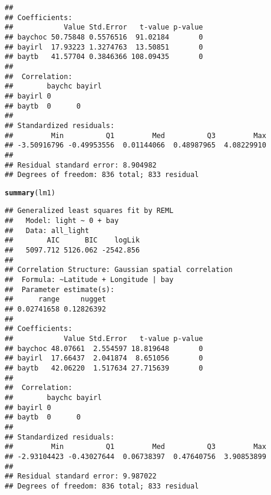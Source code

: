 \documentclass{article}\usepackage[]{graphicx}\usepackage[]{color}
\makeatletter
\newcommand{\hlstd}[1]{\textcolor[rgb]{0.345,0.345,0.345}{#1}}%
\newcommand{\hlkwd}[1]{\textcolor[rgb]{0.737,0.353,0.396}{\textbf{#1}}}%
\newenvironment{kframe}{%
 \def\at@end@of@kframe{}%
 \ifinner\ifhmode%
  \def\at@end@of@kframe{\end{minipage}}%
  \begin{minipage}{\columnwidth}%
 \fi\fi%
 \def\FrameCommand##1{\hskip\@totalleftmargin \hskip-\fboxsep
 \colorbox{shadecolor}{##1}\hskip-\fboxsep
     \hskip-\linewidth \hskip-\@totalleftmargin \hskip\columnwidth}%
 \MakeFramed {\advance\hsize-\width
   \@totalleftmargin\z@ \linewidth\hsize
   \@setminipage}}%
 {\par\unskip\endMakeFramed%
 \at@end@of@kframe}
\newenvironment{knitrout}{}{} %
\makeatother
\begin{document}
\begin{knitrout}
\begin{kframe}
\begin{verbatim}
## 
## Coefficients:
##            Value Std.Error   t-value p-value
## baychoc 50.75848 0.5576516  91.02184       0
## bayirl  17.93223 1.3274763  13.50851       0
## baytb   41.57704 0.3846366 108.09435       0
## 
##  Correlation: 
##        baychc bayirl
## bayirl 0            
## baytb  0      0     
## 
## Standardized residuals:
##         Min          Q1         Med          Q3         Max 
## -3.50916796 -0.49953556  0.01144066  0.48987965  4.08229910 
## 
## Residual standard error: 8.904982 
## Degrees of freedom: 836 total; 833 residual
\end{verbatim}
\begin{alltt}
\hlkwd{summary}\hlstd{(lm1)}
\end{alltt}
\begin{verbatim}
## Generalized least squares fit by REML
##   Model: light ~ 0 + bay 
##   Data: all_light 
##        AIC      BIC    logLik
##   5097.712 5126.062 -2542.856
## 
## Correlation Structure: Gaussian spatial correlation
##  Formula: ~Latitude + Longitude | bay 
##  Parameter estimate(s):
##      range     nugget 
## 0.02741658 0.12826392 
## 
## Coefficients:
##            Value Std.Error   t-value p-value
## baychoc 48.07661  2.554597 18.819648       0
## bayirl  17.66437  2.041874  8.651056       0
## baytb   42.06220  1.517634 27.715639       0
## 
##  Correlation: 
##        baychc bayirl
## bayirl 0            
## baytb  0      0     
## 
## Standardized residuals:
##         Min          Q1         Med          Q3         Max 
## -2.93104423 -0.43027644  0.06738397  0.47640756  3.90853899 
## 
## Residual standard error: 9.987022 
## Degrees of freedom: 836 total; 833 residual
\end{verbatim}
\end{kframe}
\end{knitrout}
\end{document}

